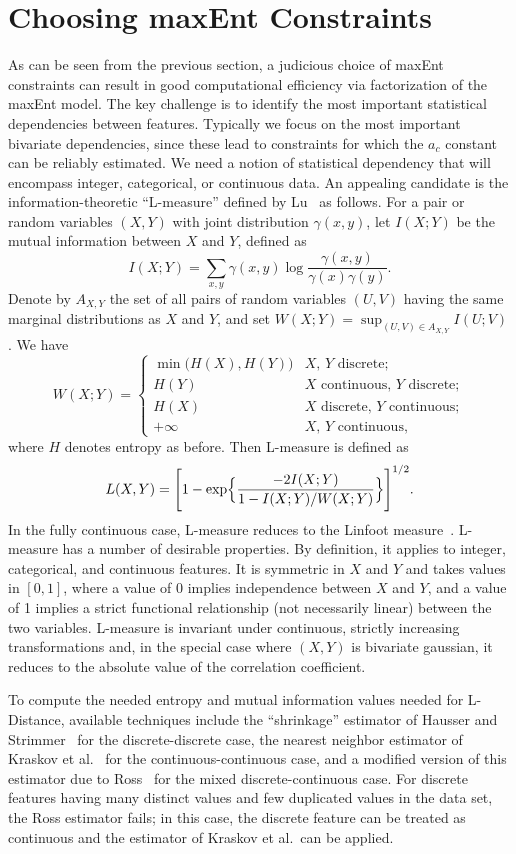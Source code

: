 \documentclass[11pt]{article}
\begin{document}
\section{Choosing maxEnt Constraints}

As can be seen from the previous section, a judicious choice of maxEnt constraints can result in good computational efficiency via factorization of the maxEnt model. The key challenge is to identify the most important statistical dependencies between features. Typically we focus on the most important bivariate dependencies, since these lead to constraints for which the $a_c$ constant can be reliably estimated. We need a notion of statistical dependency that will encompass integer, categorical, or continuous data. An appealing candidate is the information-theoretic  ``L-measure'' defined by Lu~\cite{Lu11} as follows. For a pair or random variables $(X,Y)$ with joint distribution $\gamma(x,y)$, let $I(X;Y)$ be the mutual information between $X$ and $Y$, defined as
\[
I(X;Y)=\sum_{x,y}\gamma(x,y)\log\frac{\gamma(x,y)}{\gamma(x)\gamma(y)}.
\]
Denote by $A_{X,Y}$ the set of all pairs of random variables $(U,V)$ having the same marginal distributions as $X$ and $Y$, and set $W(X;Y)=\sup_{(U,V)\in A_{X,Y}} I(U;V)$. We have
\[
W(X;Y)=
\begin{cases}
\min\bigl(H(X),H(Y)\bigr)&\text{$X$, $Y$ discrete};\\
H(Y)&\text{$X$ continuous, $Y$ discrete};\\
H(X)&\text{$X$ discrete, $Y$ continuous};\\
+\infty&\text{$X$, $Y$ continuous},
\end{cases}
\]
where $H$ denotes entropy as before. Then L-measure is defined as
\[
L(X,Y)=\Biggl[1-\exp\Bigl\{\frac{-2I(X;Y)}{1-I(X;Y)/W(X;Y)}\Bigr\}\Biggr]^{1/2}.
\]
In the fully continuous case, L-measure reduces to the Linfoot measure~\cite{Linfoot57}. L-measure has a number of desirable properties. By definition, it applies to integer, categorical, and continuous features. It is symmetric in $X$ and $Y$ and takes values in $[0,1]$, where a value of 0 implies independence between $X$ and $Y$, and a value of 1 implies a strict functional relationship (not necessarily linear) between the two variables. L-measure is invariant under continuous, strictly increasing transformations and, in the special case where $(X,Y)$ is bivariate gaussian, it reduces to the absolute value of the correlation coefficient.
 
 To compute the needed entropy and mutual information values needed for L-Distance, available techniques include the ``shrinkage'' estimator of Hausser and Strimmer~\cite{HausserS09} for the discrete-discrete case, the nearest neighbor estimator of Kraskov et al.~\cite{KraskovSG03} for the continuous-continuous case, and a modified version of this estimator due to Ross~\cite{Ross14} for the mixed discrete-continuous case. For discrete features having many distinct values and few duplicated values in the data set, the Ross estimator fails; in this case, the discrete feature can be treated as continuous and the estimator of Kraskov et al.\ can be applied. 
 
\end{document}
